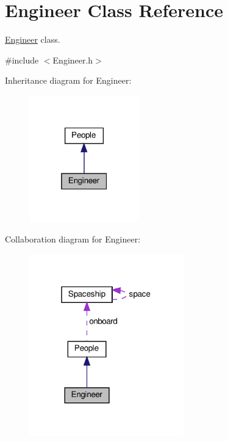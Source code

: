 \hypertarget{classEngineer}{}\section{Engineer Class Reference}
\label{classEngineer}


\hyperlink{classEngineer}{Engineer} class.  




{\ttfamily \#include $<$Engineer.\+h$>$}



Inheritance diagram for Engineer\+:\nopagebreak
\begin{figure}[H]
\begin{center}
\leavevmode
\includegraphics[width=135pt]{classEngineer__inherit__graph}
\end{center}
\end{figure}


Collaboration diagram for Engineer\+:\nopagebreak
\begin{figure}[H]
\begin{center}
\leavevmode
\includegraphics[width=190pt]{classEngineer__coll__graph}
\end{center}
\end{figure}

